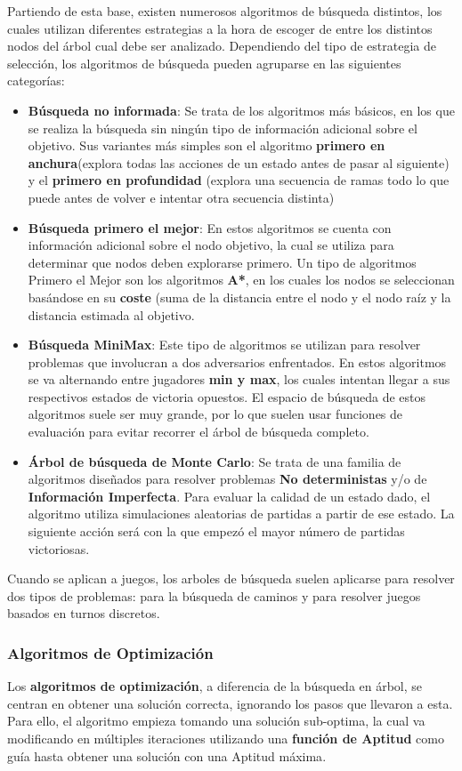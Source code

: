Partiendo de esta base, existen numerosos algoritmos de búsqueda distintos, los cuales utilizan diferentes estrategias a la hora de escoger de entre los distintos nodos del árbol cual debe ser analizado. Dependiendo del tipo de estrategia de selección, los algoritmos de búsqueda pueden agruparse en las siguientes categorías:
\begin{itemize}
\item \textbf{Búsqueda no informada}: Se trata de los algoritmos más básicos, en los que se realiza la búsqueda sin ningún tipo de información adicional sobre el objetivo. Sus variantes más simples son el algoritmo \textbf{primero en anchura}(explora todas las acciones de un estado antes de pasar al siguiente) y el \textbf{primero en profundidad} (explora una secuencia de ramas todo lo que puede antes de volver e intentar otra secuencia distinta)
\item \textbf{Búsqueda primero el mejor}: En estos algoritmos se cuenta con información adicional sobre el nodo objetivo, la cual se utiliza para determinar que nodos deben explorarse primero. Un tipo de algoritmos Primero el Mejor son los algoritmos \textbf{A*}, en los cuales los nodos se seleccionan basándose en su \textbf{coste} (suma de la distancia entre el nodo y el nodo raíz y la distancia estimada al objetivo.
\item \textbf{Búsqueda MiniMax}: Este tipo de algoritmos se utilizan para resolver problemas que involucran a dos adversarios enfrentados. En estos algoritmos se va alternando entre jugadores \textbf{min y max}, los cuales intentan llegar a sus respectivos estados de victoria opuestos. El espacio de búsqueda de estos algoritmos suele ser muy grande, por lo que suelen usar funciones de evaluación para evitar recorrer el árbol de búsqueda completo.
\item \textbf{Árbol de búsqueda de Monte Carlo}: Se trata de una familia de algoritmos diseñados para resolver problemas \textbf{No deterministas} y/o de \textbf{Información Imperfecta}. Para evaluar la calidad de un estado dado, el algoritmo utiliza simulaciones aleatorias de partidas a partir de ese estado. La siguiente acción será con la que empezó el mayor número de partidas victoriosas.
\end{itemize} 

Cuando se aplican a juegos, los arboles de búsqueda suelen aplicarse para resolver dos tipos de problemas: para la búsqueda de caminos y para resolver juegos basados en turnos discretos.

\subsubsection{Algoritmos de Optimización}
Los \textbf{algoritmos de optimización}, a diferencia de la búsqueda en árbol, se centran en obtener una solución correcta, ignorando los pasos que llevaron a esta. Para ello, el algoritmo empieza tomando una solución sub-optima, la cual va modificando en múltiples iteraciones utilizando una \textbf{función de Aptitud} como guía hasta obtener una solución con una Aptitud máxima\cite{ai_and_games}.

